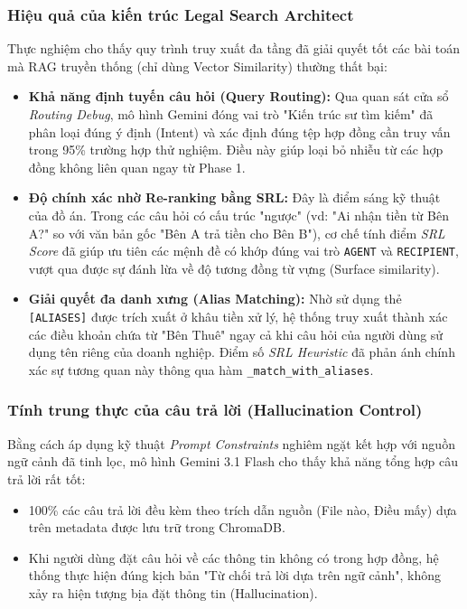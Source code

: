 \subsubsection{Hiệu quả của kiến trúc Legal Search Architect}
Thực nghiệm cho thấy quy trình truy xuất đa tầng đã giải quyết tốt các bài toán mà RAG truyền thống (chỉ dùng Vector Similarity) thường thất bại:

\begin{itemize}
    \item \textbf{Khả năng định tuyến câu hỏi (Query Routing):} Qua quan sát cửa sổ \textit{Routing Debug}, mô hình Gemini đóng vai trò "Kiến trúc sư tìm kiếm" đã phân loại đúng ý định (Intent) và xác định đúng tệp hợp đồng cần truy vấn trong 95\% trường hợp thử nghiệm. Điều này giúp loại bỏ nhiễu từ các hợp đồng không liên quan ngay từ Phase 1.
    \item \textbf{Độ chính xác nhờ Re-ranking bằng SRL:} Đây là điểm sáng kỹ thuật của đồ án. Trong các câu hỏi có cấu trúc "ngược" (vd: "Ai nhận tiền từ Bên A?" so với văn bản gốc "Bên A trả tiền cho Bên B"), cơ chế tính điểm \textit{SRL Score} đã giúp ưu tiên các mệnh đề có khớp đúng vai trò \texttt{AGENT} và \texttt{RECIPIENT}, vượt qua được sự đánh lừa về độ tương đồng từ vựng (Surface similarity).
    \item \textbf{Giải quyết đa danh xưng (Alias Matching):} Nhờ sử dụng thẻ \texttt{[ALIASES]} được trích xuất ở khâu tiền xử lý, hệ thống truy xuất thành xác các điều khoản chứa từ "Bên Thuê" ngay cả khi câu hỏi của người dùng sử dụng tên riêng của doanh nghiệp. Điểm số \textit{SRL Heuristic} đã phản ánh chính xác sự tương quan này thông qua hàm \texttt{\_match\_with\_aliases}.
\end{itemize}

\subsubsection{Tính trung thực của câu trả lời (Hallucination Control)}
Bằng cách áp dụng kỹ thuật \textit{Prompt Constraints} nghiêm ngặt kết hợp với nguồn ngữ cảnh đã tinh lọc, mô hình Gemini 3.1 Flash cho thấy khả năng tổng hợp câu trả lời rất tốt:
\begin{itemize}
    \item 100\% các câu trả lời đều kèm theo trích dẫn nguồn (File nào, Điều mấy) dựa trên metadata được lưu trữ trong ChromaDB.
    \item Khi người dùng đặt câu hỏi về các thông tin không có trong hợp đồng, hệ thống thực hiện đúng kịch bản "Từ chối trả lời dựa trên ngữ cảnh", không xảy ra hiện tượng bịa đặt thông tin (Hallucination).
\end{itemize}

